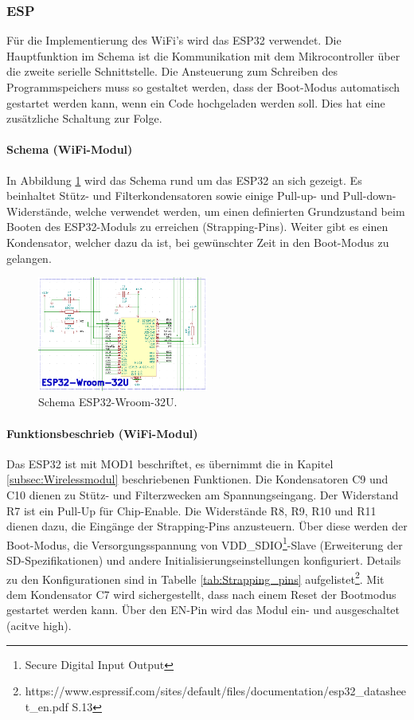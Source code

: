\newpage
\subsubsection{ESP}
\label{subsubsec:ESP}

Für die Implementierung des WiFi's wird das ESP32 verwendet. Die Hauptfunktion im Schema ist die Kommunikation mit dem Mikrocontroller über die zweite serielle Schnittstelle. Die Ansteuerung zum Schreiben des Programmspeichers muss so gestaltet werden, dass der Boot-Modus automatisch gestartet werden kann, wenn ein Code hochgeladen werden soll. Dies hat eine zusätzliche Schaltung zur Folge. 

\paragraph{Schema (WiFi-Modul)}\mbox{}

In Abbildung \ref{fig:Schema_ESP32} wird das Schema rund um das ESP32 an sich gezeigt. Es beinhaltet Stütz- und Filterkondensatoren sowie einige Pull-up- und Pull-down-Widerstände, welche verwendet werden, um einen definierten Grundzustand beim Booten des ESP32-Moduls zu erreichen (Strapping-Pins). Weiter gibt es einen Kondensator, welcher dazu da ist, bei gewünschter Zeit in den Boot-Modus zu gelangen. 

\begin{figure}[h!]
	\centering
	\includegraphics[width=0.5\textwidth]{graphics/Schema_ESP32}
	\caption{Schema ESP32-Wroom-32U.}
	\label{fig:Schema_ESP32}
\end{figure}

\paragraph{Funktionsbeschrieb (WiFi-Modul)}\mbox{}

Das ESP32 ist mit MOD1 beschriftet, es übernimmt die in Kapitel \ref{subsec:Wirelessmodul} beschriebenen Funktionen. Die Kondensatoren C9 und C10 dienen zu Stütz- und Filterzwecken am Spannungseingang. Der Widerstand R7 ist ein Pull-Up für Chip-Enable. Die Widerstände R8, R9, R10 und R11 dienen dazu, die Eingänge der Strapping-Pins anzusteuern. Über diese werden der Boot-Modus, die Versorgungsspannung von VDD\_SDIO\footnote{Secure Digital Input Output}-Slave (Erweiterung der SD-Spezifikationen) und andere Initialisierungseinstellungen konfiguriert. Details zu den Konfigurationen sind in Tabelle \ref{tab:Strapping_pins} aufgelistet\footnote{https://www.espressif.com/sites/default/files/documentation/esp32\_datasheet\_en.pdf S.13}. Mit dem Kondensator C7 wird sichergestellt, dass nach einem Reset der Bootmodus gestartet werden kann. Über den EN-Pin wird das Modul ein- und ausgeschaltet (acitve high).

